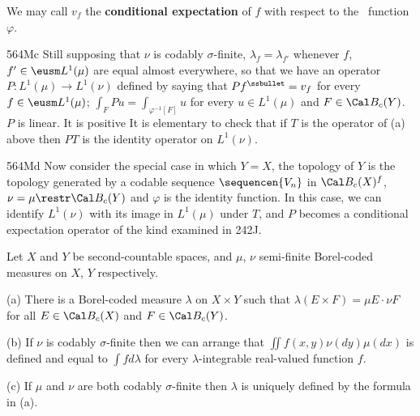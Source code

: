 We may call $v_f$ the {\bf conditional expectation} of $f$ with respect to
the \imp\ function $\varphi$.

\spheader 564Mc Still supposing that $\nu$ is codably $\sigma$-finite,
$\lambda_f=\lambda_{f'}$ whenever $f$, $f'\in\eusm L^1(\mu)$ are
equal almost everywhere, so that we have an operator
$P:L^1(\mu)\to L^1(\nu)$ defined by saying that $Pf^{\ssbullet}=v_f$ for
every $f\in\eusm L^1(\mu)$;  
$\int_FPu=\int_{\varphi^{-1}[F]}u$ for every $u\in L^1(\mu)$ and
$F\in\Cal B_c(Y)$.   
$P$ is
linear.   It is positive%
It is elementary to check that if $T$ is the operator of (a)
above then $PT$ is the identity operator on $L^1(\nu)$.

\spheader 564Md Now consider the special case in which $Y=X$,
the topology of $Y$ is the topology generated by a codable sequence
$\sequencen{V_n}$ in $\Cal B_c(X)^f$, $\nu=\mu\restr\Cal B_c(Y)$ and
$\varphi$ is the identity function.      In this case, we can identify
$L^1(\nu)$ with its image in $L^1(\mu)$ under $T$, and $P$ becomes a
conditional expectation operator of the kind examined in 242J.

 Let $X$ and $Y$ be
second-countable spaces, and $\mu$, $\nu$ semi-finite
Borel-coded measures on $X$, $Y$ respectively.

(a) There is a Borel-coded measure $\lambda$
on $X\times Y$ such that
$\lambda(E\times F)=\mu E\cdot\nu F$ for all
$E\in\Cal B_c(X)$ and $F\in\Cal B_c(Y)$.

(b) If $\nu$ is codably $\sigma$-finite then we can arrange that
$\iint f(x,y)\nu(dy)\mu(dx)$ is defined and equal to $\int fd\lambda$
for every $\lambda$-integrable real-valued function $f$.

(c) If $\mu$ and $\nu$ are both codably $\sigma$-finite then
$\lambda$ is uniquely defined by the formula in (a).

